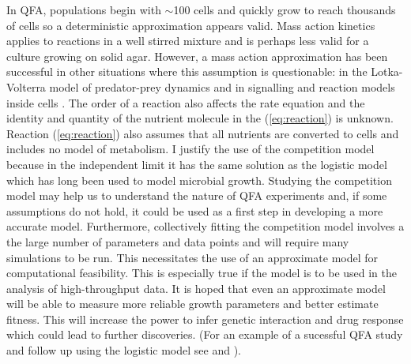 In QFA, populations begin with \(\sim\)100 cells and quickly grow to
reach thousands of cells so a deterministic approximation appears
valid.  Mass action kinetics applies to reactions in a well stirred
mixture and is perhaps less valid for a culture growing on solid agar.
However, a mass action approximation has been successful in other
situations where this assumption is questionable: in the
Lotka-Volterra model of predator-prey dynamics \citep{Berryman1992}
and in signalling and reaction models inside cells
\citep{Aldridge2006,Chen2010}. The order of a reaction also affects
the rate equation and the identity and quantity of the nutrient
molecule in the (\ref{eq:reaction}) is unknown. Reaction
(\ref{eq:reaction}) also assumes that all nutrients are converted to
cells and includes no model of metabolism. I justify the use of the
competition model because in the independent limit it has the same
solution as the logistic model which has long been used to model
microbial growth. Studying the competition model may help us to
understand the nature of QFA experiments and, if some assumptions do
not hold, it could be used as a first step in developing a more
accurate model. Furthermore, collectively fitting the competition
model involves a the large number of parameters and data points and
will require many simulations to be run. This necessitates the use of
an approximate model for computational feasibility. This is especially
true if the model is to be used in the analysis of high-throughput
data. It is hoped that even an approximate model will be able to
measure more reliable growth parameters and better estimate
fitness. This will increase the power to infer genetic interaction and
drug response which could lead to further discoveries. (For an example
of a sucessful QFA study and follow up using the logistic model see
\citet{Addinall2011} and \citet{Holstein20141259}).


